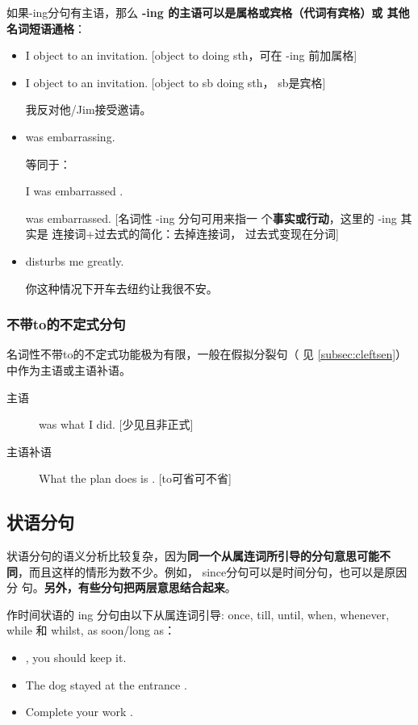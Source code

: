 如果-ing分句有主语，那么 \textbf{-ing 的主语可以是属格或宾格（代词有宾格）或
其他名词短语通格}：
\begin{itemize}
\item I object to  an invitation. [object to doing
  sth，可在 -ing 前加属格]
\item I object to  an invitation. [object to sb
  doing sth， sb是宾格]

  我反对他/Jim接受邀请。

\item {} was embarrassing.


  等同于：

  I was embarrassed .

   was embarrassed. [名词性 -ing 分句可用来指一
  个\textbf{事实或行动}，这里的 -ing 其实是 连接词+过去式的简化：去掉连接词，
  过去式变现在分词]

\item {} disturbs me greatly.

  你这种情况下开车去纽约让我很不安。

\end{itemize}

\subsubsection{不带to的不定式分句}

名词性不带to的不定式功能极为有限，一般在假拟分裂句（
见 \cref{subsec:cleftsen}）中作为主语或主语补语。
\begin{description}
\item[主语]  was what I did. [少见且非正式]
\item[主语补语] What the plan does is .
  [to可省可不省]
\end{description}

\subsection{状语分句}

状语分句的语义分析比较复杂，因为\textbf{同一个从属连词所引导的分句意思可能不
  同}，而且这样的情形为数不少。例如， since分句可以是时间分句，也可以是原因分
句。\textbf{另外，有些分句把两层意思结合起来}。

作时间状语的 ing 分句由以下从属连词引导: once, till, until, when, whenever,
while 和 whilst, as soon/long as：
\begin{itemize}
\item {}, you should keep it.
\item The dog stayed at the entrance .
\item Complete your work .
\end{itemize}

